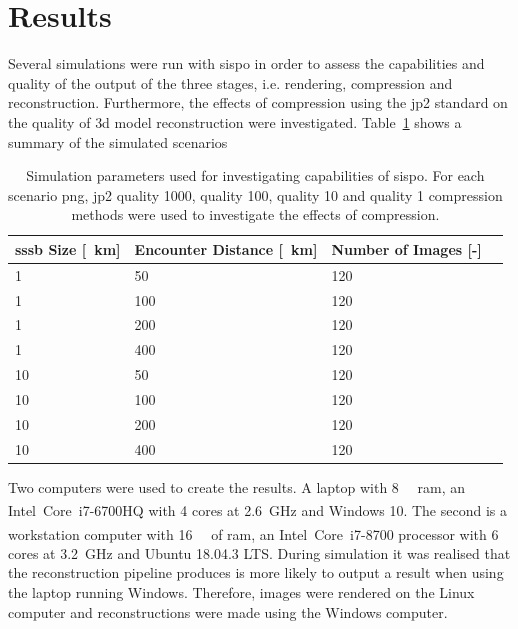 \section{Results} \label{sec:results}
Several simulations were run with \gls{sispo} in order to assess the capabilities and quality of the output of the three stages, i.e. rendering, compression and reconstruction. Furthermore, the effects of compression using the \gls{jp2} standard on the quality of \gls{3d} model reconstruction were investigated. Table~\ref{tab:sim_params} shows a summary of the simulated scenarios

\begin{table}[htb]
    \centering
    \caption{Simulation parameters used for investigating capabilities of \gls{sispo}. For each scenario \gls{png}, \gls{jp2} quality 1000, quality 100, quality 10 and quality 1 compression methods were used to investigate the effects of compression.}
    \label{tab:sim_params}
    \begin{tabular}{l|lll}
        \textbf{\gls{sssb} Size [\SI{}{\kilo\meter}]}& \textbf{Encounter Distance [\SI{}{\kilo\meter}]} & \textbf{Number of Images [-]} \\ \hline
        1  & 50  & 120\\
        1  & 100 & 120\\
        1  & 200 & 120\\
        1  & 400 & 120\\
        10 & 50  & 120\\
        10 & 100 & 120\\
        10 & 200 & 120\\
        10 & 400 & 120\\
    \end{tabular}
\end{table}

Two computers were used to create the results. A laptop with \SI{8}{\giga\byte} \gls{ram}, an Intel\textsuperscript{\textregistered}~Core\texttrademark~i7-6700HQ with \SI{4}{} cores at \SI{2.6}{\giga\hertz} and Windows 10. The second is a workstation computer with \SI{16}{\giga\byte} of \gls{ram}, an Intel\textsuperscript{\textregistered}~Core\texttrademark~i7-8700 processor with \SI{6}{} cores at \SI{3.2}{\giga\hertz} and Ubuntu 18.04.3 LTS.
During simulation it was realised that the reconstruction pipeline produces is more likely to output a result when using the laptop running Windows. Therefore, images were rendered on the Linux computer and reconstructions were made using the Windows computer.

